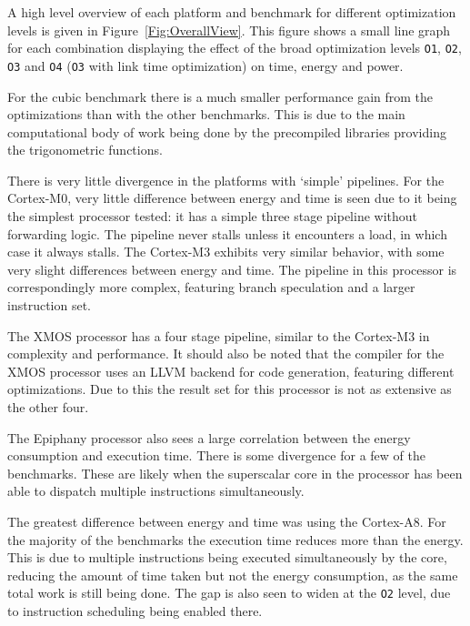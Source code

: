 \documentclass[twocolumn]{article}
\begin{document}
A high level overview of each platform and benchmark for different optimization levels is given in Figure~\ref{Fig:OverallView}. This figure shows a small line graph for each combination displaying the effect of the broad optimization levels \texttt{O1}, \texttt{O2}, \texttt{O3} and \texttt{O4} (\texttt{O3} with link time optimization) on time, energy and power.

For the cubic benchmark there is a much smaller performance gain from the optimizations than with the other benchmarks. This is due to the main computational body of work being done by the precompiled libraries providing the trigonometric functions.

There is very little divergence in the platforms with `simple' pipelines. For the Cortex-M0, very little difference between energy and time is seen due to it being the simplest processor tested: it has a simple three stage pipeline without forwarding logic. The pipeline never stalls unless it encounters a load, in which case it always stalls. The Cortex-M3 exhibits very similar behavior, with some very slight differences between energy and time. The pipeline in this processor is correspondingly more complex, featuring branch speculation and a larger instruction set\cite{Yiu2010}.

The XMOS processor has a four stage pipeline, similar to the Cortex-M3 in complexity and performance. It should also be noted that the compiler for the XMOS processor uses an LLVM backend for code generation, featuring different optimizations. Due to this the result set for this processor is not as extensive as the other four.

The Epiphany processor also sees a large correlation between the energy consumption and execution time. There is some divergence for a few of the benchmarks. These are likely when the superscalar core in the processor has been able to dispatch multiple instructions simultaneously.

The greatest difference between energy and time was using the Cortex-A8. For the majority of the benchmarks the execution time reduces more than the energy. This is due to multiple instructions being executed simultaneously by the core, reducing the amount of time taken but not the energy consumption, as the same total work is still being done. The gap is also seen to widen at the \texttt{O2} level, due to instruction scheduling being enabled there.
\end{document}
